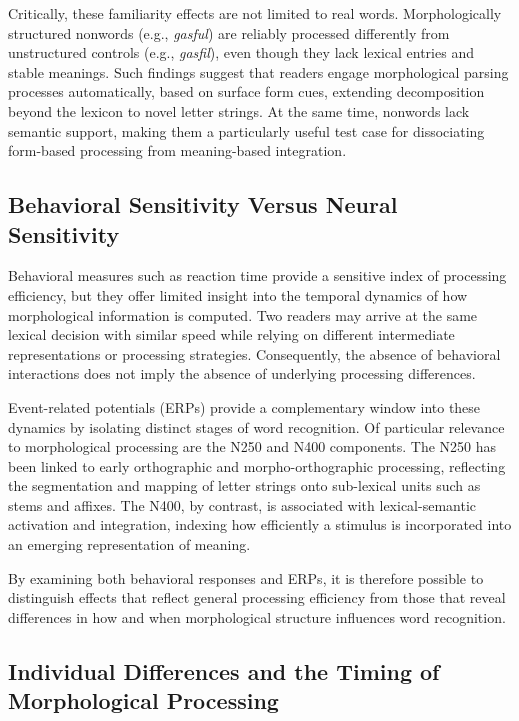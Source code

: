 \documentclass[preprint,12pt, authoryear, review]{elsarticle}
\begin{document}
Critically, these familiarity effects are not limited to real words. Morphologically structured nonwords (e.g., \textit{gasful}) are reliably processed differently from unstructured controls (e.g., \textit{gasfil}), even though they lack lexical entries and stable meanings. Such findings suggest that readers engage morphological parsing processes automatically, based on surface form cues, extending decomposition beyond the lexicon to novel letter strings. At the same time, nonwords lack semantic support, making them a particularly useful test case for dissociating form-based processing from meaning-based integration.

\subsection{Behavioral Sensitivity Versus Neural Sensitivity}

Behavioral measures such as reaction time provide a sensitive index of processing efficiency, but they offer limited insight into the temporal dynamics of how morphological information is computed. Two readers may arrive at the same lexical decision with similar speed while relying on different intermediate representations or processing strategies. Consequently, the absence of behavioral interactions does not imply the absence of underlying processing differences.

Event-related potentials (ERPs) provide a complementary window into these dynamics by isolating distinct stages of word recognition. Of particular relevance to morphological processing are the N250 and N400 components. The N250 has been linked to early orthographic and morpho-orthographic processing, reflecting the segmentation and mapping of letter strings onto sub-lexical units such as stems and affixes. The N400, by contrast, is associated with lexical-semantic activation and integration, indexing how efficiently a stimulus is incorporated into an emerging representation of meaning.

By examining both behavioral responses and ERPs, it is therefore possible to distinguish effects that reflect general processing efficiency from those that reveal differences in how and when morphological structure influences word recognition.

\subsection{Individual Differences and the Timing of Morphological Processing}
\end{document}
